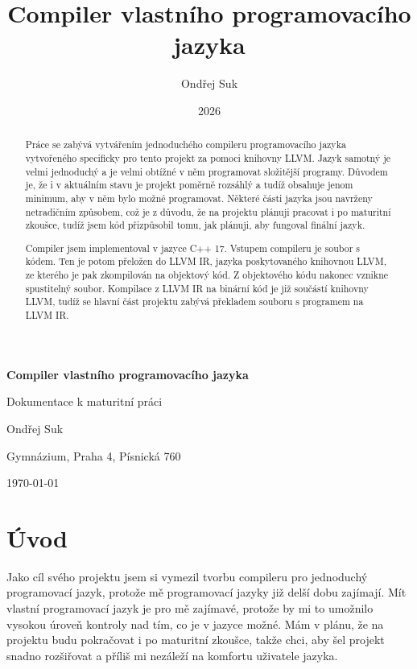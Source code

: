\documentclass[12pt, a4paper, titlepage, abstract=on]{scrreprt}
\title{Compiler vlastního programovacího jazyka}
\author{Ondřej Suk}
\date{2026}
\begin{document}
\begin{titlepage}
    \centering
    {\Huge \textbf{Compiler vlastního programovacího jazyka}\par}
    \vspace{2cm}
    {\Large Dokumentace k maturitní práci\par}
    \vfill

    
    \vfill

    {\large Ondřej Suk}
    {\large Gymnázium, Praha 4, Písnická 760\par}
    {\large \today}

\end{titlepage}

\begin{abstract}
Práce se zabývá vytvářením jednoduchého compileru programovacího jazyka vytvořeného specificky pro tento projekt za pomoci knihovny LLVM.
Jazyk samotný je velmi jednoduchý a je velmi obtížné v něm programovat složitější programy. Důvodem je, že i v aktuálním stavu je projekt poměrně
rozsáhlý a tudíž obsahuje jenom minimum, aby v něm bylo možné programovat. Některé části jazyka jsou navrženy netradičním způsobem, což je z důvodu, že na projektu plánuji pracovat i po maturitní zkoušce, tudíž jsem kód přizpůsobil tomu, jak plánuji, aby fungoval finální jazyk.

Compiler jsem implementoval v jazyce C++ 17. Vstupem compileru je soubor s kódem. Ten je potom přeložen do LLVM IR, jazyka poskytovaného knihovnou
LLVM, ze kterého je pak zkompilován na objektový kód. Z objektového kódu nakonec vznikne spustitelný soubor. Kompilace z LLVM IR na binární kód je
již součástí knihovny LLVM, tudíž se hlavní část projektu zabývá překladem souboru s programem na LLVM IR.
\end{abstract}

\tableofcontents
\clearpage

\chapter{Úvod}
Jako cíl svého projektu jsem si vymezil tvorbu compileru pro jednoduchý programovací jazyk, protože mě programovací jazyky již delší dobu zajímají. Mít vlastní programovací jazyk je pro mě zajímavé, protože by mi to umožnilo vysokou úroveň kontroly nad tím, co je v jazyce možné. Mám v plánu, že na projektu budu pokračovat i po maturitní zkoušce, takže chci, aby šel projekt snadno rozšiřovat a příliš mi nezáleží na komfortu uživatele jazyka.
\end{document}

